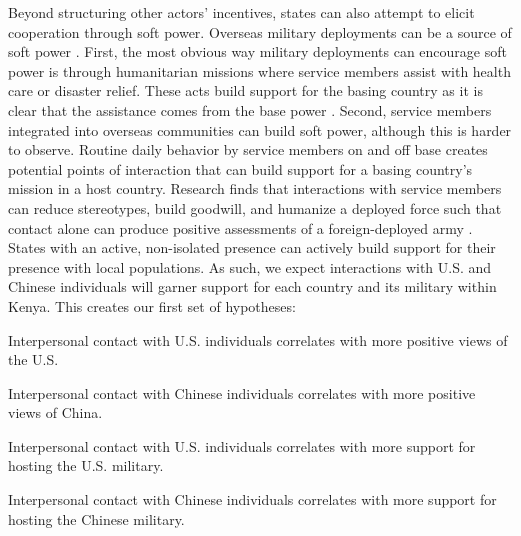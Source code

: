 Beyond structuring other actors' incentives, states can also attempt to elicit cooperation through soft power. Overseas military deployments can be a source of soft power \cite{atkinson2014}. First, the most obvious way military deployments can encourage soft power is through humanitarian missions where service members assist with health care or disaster relief. These acts build support for the basing country as it is clear that the assistance comes from the base power \cite{flynn2019}. Second, service members integrated into overseas communities can build soft power, although this is harder to observe. Routine daily behavior by service members on and off base creates potential points of interaction that can build support for a basing country's mission in a host country. Research finds that interactions with service members can reduce stereotypes, build goodwill, and humanize a deployed force such that contact alone can produce positive assessments of a foreign-deployed army \cite{allen2023}. States with an active, non-isolated presence can actively build support for their presence with local populations. As such, we expect interactions with U.S. and Chinese individuals will garner support for each country and its military within Kenya. This creates our first set of hypotheses:

\begin{subhyp}
	
	\begin{hyp}
		Interpersonal contact with U.S. individuals correlates with more positive views of the U.S.
	\end{hyp}
	
	\begin{hyp}
		Interpersonal contact with Chinese individuals correlates with more positive views of China.
	\end{hyp}
	
\end{subhyp}

\begin{subhyp}
	
	\begin{hyp}
		Interpersonal contact with U.S. individuals correlates with more support for hosting the U.S. military.
	\end{hyp}
	
	\begin{hyp}
		Interpersonal contact with Chinese individuals correlates with more support for hosting the Chinese military.
	\end{hyp}
	
\end{subhyp}

